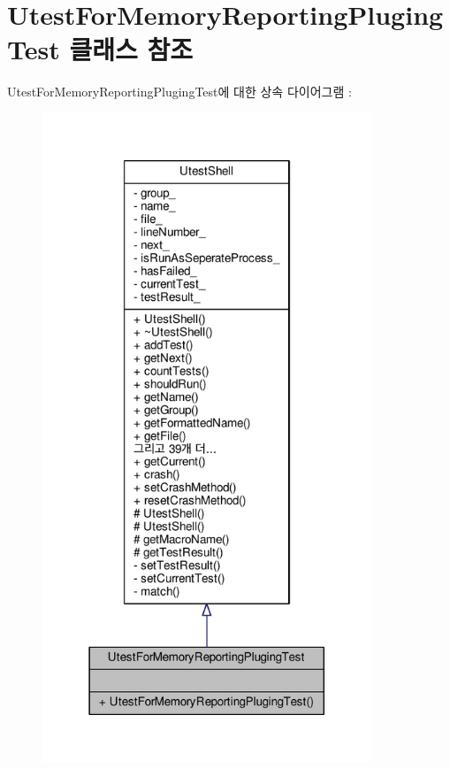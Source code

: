 \hypertarget{class_utest_for_memory_reporting_pluging_test}{}\section{Utest\+For\+Memory\+Reporting\+Pluging\+Test 클래스 참조}
\label{class_utest_for_memory_reporting_pluging_test}


Utest\+For\+Memory\+Reporting\+Pluging\+Test에 대한 상속 다이어그램 \+: 
\nopagebreak
\begin{figure}[H]
\begin{center}
\leavevmode
\includegraphics[height=550pt]{class_utest_for_memory_reporting_pluging_test__inherit__graph}
\end{center}
\end{figure}



